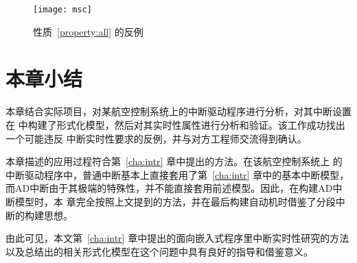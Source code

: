 \begin{figure}[H]
	\centering
	\texttt{[image: msc]}
	\caption{性质~\ref{property:all} 的反例}
	\label{fig:exp_counter}
\end{figure}

\section{本章小结}
\label{sec:sum_4}

本章结合实际项目，对某航空控制系统上的中断驱动程序进行分析，对其中断设置在\uppaal 
中构建了形式化模型，然后对其实时性属性进行分析和验证。该工作成功找出一个可能违反
中断实时性要求的反例，并与对方工程师交流得到确认。

本章描述的应用过程符合第~\ref{cha:intr} 章中提出的方法。在该航空控制系统上
的中断驱动程序中，普通中断基本上直接套用了第~\ref{cha:intr} 章中的基本中断模型，
而AD中断由于其极端的特殊性，并不能直接套用前述模型。因此，在构建AD中断模型时，本
章完全按照上文提到的方法，并在最后构建自动机时借鉴了分段中断的构建思想。

由此可见，本文第~\ref{cha:intr} 章中提出的面向嵌入式程序里中断实时性研究的方法
以及总结出的相关形式化模型在这个问题中具有良好的指导和借鉴意义。